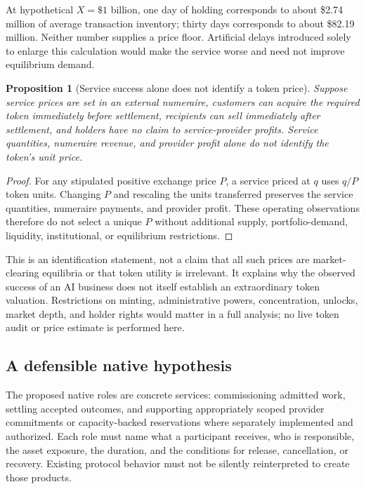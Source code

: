 \documentclass[11pt,letterpaper]{article}
\newtheorem{proposition}{Proposition}[section]
\theoremstyle{remark}\newtheorem{remark}{Remark}[section]
\begin{document}
At hypothetical $X=\$1$ billion, one day of holding corresponds to about \$2.74 million of average transaction inventory; thirty days corresponds to about \$82.19 million. Neither number supplies a price floor. Artificial delays introduced solely to enlarge this calculation would make the service worse and need not improve equilibrium demand.

\begin{proposition}[Service success alone does not identify a token price]\label{prop:no-price}
Suppose service prices are set in an external numeraire, customers can acquire the required token immediately before settlement, recipients can sell immediately after settlement, and holders have no claim to service-provider profits. Service quantities, numeraire revenue, and provider profit alone do not identify the token's unit price.
\end{proposition}
\begin{proof}
For any stipulated positive exchange price $P$, a service priced at $q$ uses $q/P$ token units. Changing $P$ and rescaling the units transferred preserves the service quantities, numeraire payments, and provider profit. These operating observations therefore do not select a unique $P$ without additional supply, portfolio-demand, liquidity, institutional, or equilibrium restrictions.
\end{proof}

This is an identification statement, not a claim that all such prices are market-clearing equilibria or that token utility is irrelevant. It explains why the observed success of an AI business does not itself establish an extraordinary token valuation. Restrictions on minting, administrative powers, concentration, unlocks, market depth, and holder rights would matter in a full analysis; no live token audit or price estimate is performed here.

\subsection{A defensible native hypothesis}
The proposed native roles are concrete services: commissioning admitted work, settling accepted outcomes, and supporting appropriately scoped provider commitments or capacity-backed reservations where separately implemented and authorized. Each role must name what a participant receives, who is responsible, the asset exposure, the duration, and the conditions for release, cancellation, or recovery. Existing protocol behavior must not be silently reinterpreted to create those products.
\end{document}

